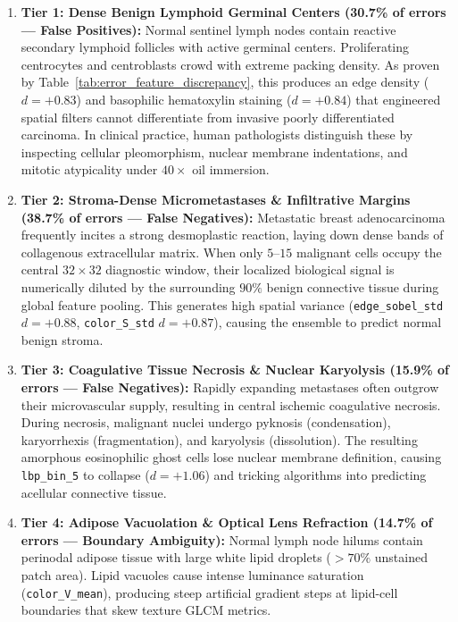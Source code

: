 \documentclass[11pt,a4paper]{article}
\begin{document}
\begin{enumerate}[leftmargin=*]
    \item \textbf{Tier 1: Dense Benign Lymphoid Germinal Centers (30.7\% of errors — False Positives):}
    Normal sentinel lymph nodes contain reactive secondary lymphoid follicles with active germinal centers. Proliferating centrocytes and centroblasts crowd with extreme packing density. As proven by Table~\ref{tab:error_feature_discrepancy}, this produces an edge density ($d = +0.83$) and basophilic hematoxylin staining ($d = +0.84$) that engineered spatial filters cannot differentiate from invasive poorly differentiated carcinoma. In clinical practice, human pathologists distinguish these by inspecting cellular pleomorphism, nuclear membrane indentations, and mitotic atypicality under $40\times$ oil immersion.

    \item \textbf{Tier 2: Stroma-Dense Micrometastases \& Infiltrative Margins (38.7\% of errors — False Negatives):}
    Metastatic breast adenocarcinoma frequently incites a strong desmoplastic reaction, laying down dense bands of collagenous extracellular matrix. When only $5$--$15$ malignant cells occupy the central $32 \times 32$ diagnostic window, their localized biological signal is numerically diluted by the surrounding $90\%$ benign connective tissue during global feature pooling. This generates high spatial variance (\texttt{edge\_sobel\_std} $d = +0.88$, \texttt{color\_S\_std} $d = +0.87$), causing the ensemble to predict normal benign stroma.

    \item \textbf{Tier 3: Coagulative Tissue Necrosis \& Nuclear Karyolysis (15.9\% of errors — False Negatives):}
    Rapidly expanding metastases often outgrow their microvascular supply, resulting in central ischemic coagulative necrosis. During necrosis, malignant nuclei undergo pyknosis (condensation), karyorrhexis (fragmentation), and karyolysis (dissolution). The resulting amorphous eosinophilic ghost cells lose nuclear membrane definition, causing \texttt{lbp\_bin\_5} to collapse ($d = +1.06$) and tricking algorithms into predicting acellular connective tissue.

    \item \textbf{Tier 4: Adipose Vacuolation \& Optical Lens Refraction (14.7\% of errors — Boundary Ambiguity):}
    Normal lymph node hilums contain perinodal adipose tissue with large white lipid droplets ($>70\%$ unstained patch area). Lipid vacuoles cause intense luminance saturation (\texttt{color\_V\_mean}), producing steep artificial gradient steps at lipid-cell boundaries that skew texture GLCM metrics.
\end{enumerate}
\end{document}
